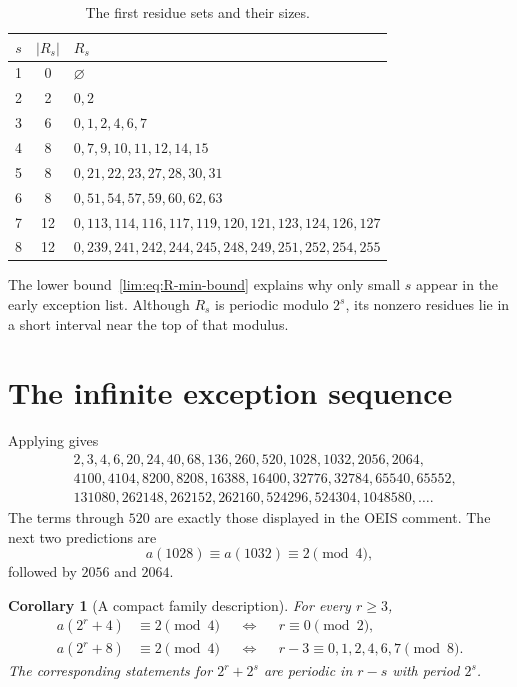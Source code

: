 \documentclass[11pt]{article}
\newtheorem{corollary}[theorem]{Corollary}
\theoremstyle{definition}
\theoremstyle{remark}
\begin{document}
\begin{table}[ht]
\centering
\caption{The first residue sets and their sizes.}
\label{lim:tab:residue-sets}
\begin{tabular}{c c l}
\toprule
$s$ & $|R_s|$ & $R_s$\\
\midrule
1&0&$\varnothing$\\
2&2&$0,2$\\
3&6&$0,1,2,4,6,7$\\
4&8&$0,7,9,10,11,12,14,15$\\
5&8&$0,21,22,23,27,28,30,31$\\
6&8&$0,51,54,57,59,60,62,63$\\
7&12&$0,113,114,116,117,119,120,121,123,124,126,127$\\
8&12&$0,239,241,242,244,245,248,249,251,252,254,255$\\
\bottomrule
\end{tabular}
\end{table}

The lower bound~\eqref{lim:eq:R-min-bound} explains why only small $s$ appear in
the early exception list.  Although $R_s$ is periodic modulo $2^s$, its
nonzero residues lie in a short interval near the top of that modulus.

\section{The infinite exception sequence}

Applying  gives
\begin{align*}
&2,3,4,6,20,24,40,68,136,260,520,1028,1032,2056,2064,\\
&4100,4104,8200,8208,16388,16400,32776,32784,65540,65552,\\
&131080,262148,262152,262160,524296,524304,1048580,\ldots.
\end{align*}
The terms through $520$ are exactly those displayed in the OEIS comment.
The next two predictions are
\[
 a(1028)\equiv a(1032)\equiv2\pmod4,
\]
followed by $2056$ and $2064$.

\begin{corollary}[A compact family description]
\label{lim:cor:families}
For every $r\ge3$,
\begin{align*}
 a(2^r+4)&\equiv2\pmod4
   &&\Longleftrightarrow&&r\equiv0\pmod2,\\
 a(2^r+8)&\equiv2\pmod4
   &&\Longleftrightarrow&&r-3\equiv0,1,2,4,6,7\pmod8.
\end{align*}
The corresponding statements for $2^r+2^s$ are periodic in $r-s$ with
period $2^s$.
\end{corollary}
\end{document}
